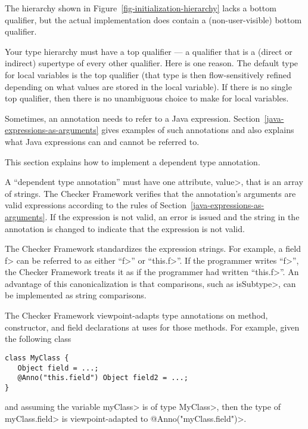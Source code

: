 The hierarchy shown in Figure~\ref{fig-initialization-hierarchy} lacks
a bottom qualifier, but the actual implementation does contain a (non-user-visible) bottom qualifier.


Your type hierarchy must have a top qualifier
--- a qualifier that is a (direct or indirect) supertype of every other
qualifier.
Here is one reason.
The default type for local variables is the top
qualifier (that type is then flow-sensitively
refined depending on what values are stored in the local variable).
If there is no single top qualifier, then there is no
unambiguous choice to make for local variables.



Sometimes, an annotation needs to refer to a Java expression.
Section~\ref{java-expressions-as-arguments} gives examples of such
annotations and also explains what Java expressions can and cannot be
referred to.

This section explains how to implement a dependent type annotation.

A ``dependent type annotation''
must have one attribute, \<value>, that is an
array of strings.  The Checker Framework verifies that the annotation's
arguments are valid expressions according to the rules of
Section~\ref{java-expressions-as-arguments}.  If
the expression is not valid, an error is issued and the string in the
annotation is changed to indicate that the expression is not valid.

The Checker Framework standardizes the expression strings.  For example, a
field \<f> can be referred to as either ``\<f>'' or ``\<this.f>''.  If the
programmer writes ``\<f>'', the Checker Framework treats it
as if the programmer had written ``\<this.f>''.
An advantage of this canonicalization is
that comparisons, such as \<isSubtype>, can be implemented as string comparisons.

The Checker Framework viewpoint-adapts type annotations on method, constructor,
and field declarations at uses for those methods.  For example, given the
following class

\begin{Verbatim}
class MyClass {
   Object field = ...;
   @Anno("this.field") Object field2 = ...;
}
\end{Verbatim}
and assuming the variable \<myClass> is of type \<MyClass>, then the type of
\<myClass.field> is viewpoint-adapted to \<@Anno("myClass.field")>.

